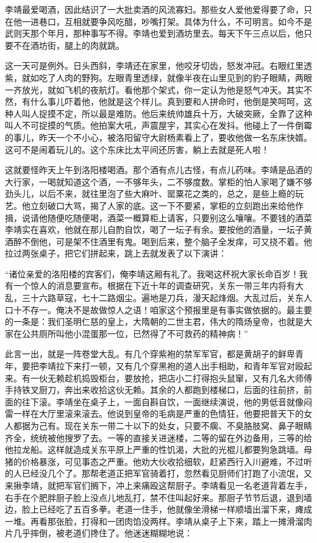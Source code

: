 李靖最爱喝酒，因此结识了一大批卖酒的风流寡妇。那些女人爱他爱得要了命，只在他一进巷口，互相就要争风吃醋，吵嘴打架。具体为什么，不可明言。如今不是武则天那个年月，那种事写不得。李靖也爱到酒坊里去。每天下午三点以后，他只要不在酒坊街，腿上的肉就跳。

这一天可是例外。日头西斜，李靖还在家里，他咬牙切齿，怒发冲冠。右眼红里透紫，就如吃了人肉的野狗。左眼青里透绿，就像半夜在山里见到的豹子眼睛，两眼一齐放光，就如飞机的夜航灯。看他那个架式，你一定认为他是怒气冲天。其实不然，有什么事儿吓着他，他就是这个样儿。真到要和人拼命时，他倒是笑呵呵，这种人叫人捉摸不定，所以最是难防。他后来统帅雄兵十万，大破突厥，全靠了这种叫人不可捉摸的气质。他拍案大吼，声震屋宇，其实心在发抖。他碰上了一件倒霉的事儿，昨天一个不小心，被洛阳留守大尉杨素看上了，要收他做一名东床快婿。这可不是闹着玩儿的。这个东床比太平间还厉害，躺上去就是死人啦！

这就要怪昨天上午到洛阳楼喝酒。那个酒有点儿古怪，有点儿药味。李靖是品酒的大行家，一喝就知道这个酒，一不够年头，二不够度数。掌柜的怕人家喝了嫌不够劲头儿，以后不来，就往里泡了些大麻叶、罂粟花之类的，总之，是些上瘾的玩艺。他立刻破口大骂，揭了人家的底。这一下不要紧，掌柜的立刻跑出来给他作揖，说请他随便吃随便喝，酒菜一概算柜上请客，只要别这么嚷嚷。不要钱的酒菜李靖实在喜欢，他就在那儿自酌自饮，喝了一坛子有余。要按他的酒量，一坛子黄酒醉不倒他，可是架不住酒里有鬼。喝到后来，整个脑子全发痒，可又挠不着。他拉过两张桌子，把它们拼起来，跳上去就发表了以下演讲：

“诸位亲爱的洛阳楼的宾客们，俺李靖这厢有礼了。我喝这杯祝大家长命百岁！我有一个惊人的消息要宣布。根据在下近十年的调查研究，关东一带三年内将有大乱，三十六路草寇，七十二路烟尘。遍地是刀兵，漫天起烽烟。大乱过后，关东人口十不存一。俺决不是故做惊人之语！咱家这个预报里是有事实做依据的。最主要的一条是：我们圣明仁慈的皇上，大隋朝的二世主君，伟大的隋炀皇帝，也就是大家在公共厕所叫他小混蛋那一位，已然得了不可救药的精神病！”

此言一出，就是一阵卷堂大乱。有几个穿紫袍的禁军军官，都是黄胡子的鲜卑青年，要把李靖拉下来打一顿，又有几个穿黑袍的道人出手相助，和青年军官对殴起来。有一伙无赖趁机捣毁柜台，要放抢，把店小二打得抱头鼠窜，又有几名大师傅手持铁叉厨刀，奔出来收拾这伙无赖。其余的人都跑到楼梯口，后面的往前挤，前面的往下滚。李靖坐在桌子上，一面自斟自饮，一面继续演说，他的男低音就像闷雷一样在大厅里滚来滚去。他说到皇帝的毛病是严重的色情狂，他要把普天下的女人都据为己有。现在关东一带二十以下的处女，只要不瘸、不臭胳肢窝、鼻子眼睛齐全，统统被他搜罗了去。一等的直接关进迷楼，二等的留在外边备用，三等的给他拉龙船。这样就造成关东平原上严重的性饥渴，大批的光棍儿都要狗急跳墙。母猪的价格暴涨，可见事态之严重。他劝大伙收拾细软，赶紧西行入川避难，不过听的人已经没几个了。那帮老道正把军官骑着打，忽然看见厨师们打跑了小流氓，又来揪李靖，就把军官们搁下，冲上来痛殴这帮厨子。李靖看见一名老道背着左手，右手在个肥胖厨子脸上没点儿地乱打，禁不住叫起好来。那厨子节节后退，退到墙边，脸上已经吃了五百多拳。老道一住手，他就像坐滑梯一样顺墙出溜下来，瘫成一堆。再看那张脸，打得和一团肉馅没两样。李靖从桌子上下来，踏上一摊滑溜肉片几乎摔倒，被老道们搀住了。他迷迷糊糊地说：

